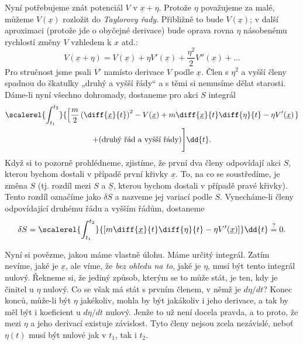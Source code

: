     Nyní potřebujeme znát potenciál \(V\) v \(\underline{x}+\eta\). Protože \(\eta\) považujeme za
    malé, můžeme \(V(\underline{x})\) rozložit do \emph{Taylorovy řady}. Přibližně to bude
    \(V(\underline{x})\); v další aproximaci (protože jde o obyčejné derivace) bude oprava rovna
    \(\eta\) násobenému rychlostí změny \(V\) vzhledem k \(x\) atd.:
    \begin{equation*}
      V(\underline{x}+\eta) = V(\underline{x}) + \eta V'(\underline{x})
      + \dfrac{\eta^2}{2} V''(\underline{x}) + \ldots
    \end{equation*}
    Pro stručnost jsme psali \(V'\) namísto derivace \(V\) podle \(\underline{x}\). Člen s
    \(\eta^2\) a vyšší členy spadnou do škatulky „druhý a vyšší řády“ a s těmi si nemusíme dělat
    starosti. Dáme-li nyní všechno dohromady, dostaneme pro akci \(S\) integrál
    \begin{multline*}
      \scalerel{\int_{t_1}^{t_2}}{
        \left[
            \frac{m}{2}\left(\diff{\underline{x}}{t}\right)^2-V(\underline{x}) 
            + m\diff{\underline{x}}{t}\diff{\eta}{t} - \eta V'(\underline{x}) 
        \right.}        \\
            + (\text{druhý řád a vyšší řády})
        \Bigg]
      \dd{t}.
    \end{multline*}
    Když si to pozorně prohlédneme, zjistíme, že první dva členy odpovídají akci \(S\), kterou
    bychom dostali v případě první křivky \(\underline{x}\). To, na co se soustředíme, je změna
    \(S\) (tj. rozdíl mezi \(S\) a \(\underline{S}\), kterou bychom dostali v případě pravé křivky).
    Tento rozdíl označíme jako \(\delta S\) a nazveme jej variací podle \(S\). Vynecháme-li členy
    odpovídající druhému řádu a vyšším řádům, dostaneme
    \begin{equation*}
      \delta S  = \scalerel{\int_{t_1}^{t_2}}{
                    \left[m\diff{\underline{x}}{t}\diff{\eta}{t} - \eta V'(\underline{x})\right]
        }\dd{t} \stackrel{?}{=} 0.
    \end{equation*}  
    
    Nyní si povězme, jakou máme vlastně úlohu. Máme určitý integrál. Zatím nevíme, jaké je
    \(\underline{x}\), ale víme, že \emph{bez ohledu na to}, jaké je \(\eta\), musí být tento
    integrál nulový. Řekneme si, že jediný způsob, kterým se to může stát, je ten, kdy je činitel u
    \(\eta\) nulový. Co se však má stát s prvním členem, v němž je \(d\eta/dt\)? Konec konců,
    může-li být \(\eta\) jakékoliv, mohla by být jakákoliv i jeho derivace, a tak by měl být i
    koeficient u \(d\eta/dt\) nulový. Jenže to už není docela pravda, a to proto, že mezi \(\eta\) a
    jeho derivací existuje závislost. Tyto členy nejsou zcela nezávislé, neboť \(\eta(t)\) musí být
    nulové jak v \(t_1\), tak i \(t_2\).

